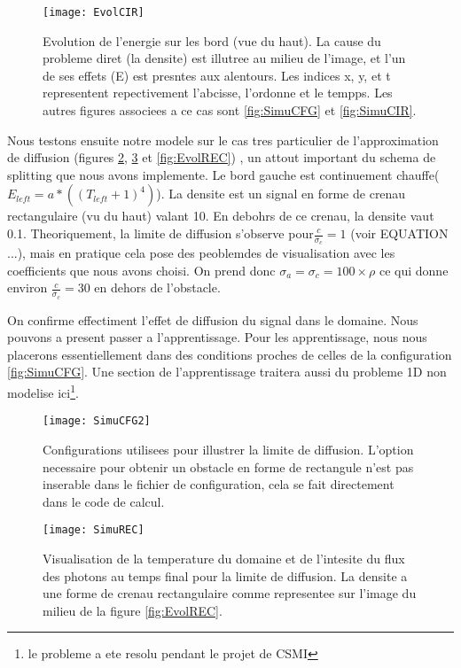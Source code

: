 \begin{figure}[H]
\centering
\texttt{[image: EvolCIR]} 
\decoRule
\caption[EvolCIR]{Evolution de l'energie sur les bord (vue du haut). La cause du probleme diret (la densite) est illutree au milieu de l'image, et l'un de ses effets (E) est presntes aux alentours. Les indices x, y, et t representent repectivement l'abcisse, l'ordonne et le tempps. Les autres figures associees a ce cas sont \ref{fig:SimuCFG} et \ref{fig:SimuCIR}.  }
\label{fig:EvolCIR}
\end{figure}

Nous testons ensuite notre modele sur le cas tres particulier de l'approximation de diffusion (figures \ref{fig:SimuCFG2}, \ref{fig:SimuREC} et \ref{fig:EvolREC}) , un attout important du schema de splitting que nous avons implemente. Le bord gauche est continuement chauffe($E_{left} = a*((T_{left}+1)^4)$). La densite est un signal en forme de crenau rectangulaire (vu du haut) valant 10. En debohrs de ce crenau, la densite vaut 0.1. Theoriquement, la limite de diffusion s'observe pour$\frac{c}{\sigma_c} = 1$ (voir EQUATION ...), mais en pratique cela pose des peoblemdes de visualisation avec les coefficients que nous avons choisi. On prend donc $\sigma_a = \sigma_c = 100 \times \rho$ ce qui donne environ $\frac{c}{\sigma_c} = 30$ en dehors de l'obstacle.

On confirme effectiment l'effet de diffusion du signal dans le domaine. Nous pouvons a present passer a l'apprentissage. Pour les apprentissage, nous nous placerons essentiellement dans des conditions proches de celles de la configuration \ref{fig:SimuCFG}. Une section de l'apprentissage traitera aussi du probleme 1D non modelise ici\footnote{le probleme a ete resolu pendant le projet de CSMI}. 

\begin{figure}[!h]
\centering
\texttt{[image: SimuCFG2]} 
\decoRule
\caption[SimuCFG2]{Configurations utilisees pour illustrer la limite de diffusion. L'option necessaire pour obtenir un obstacle en forme de rectangule n'est pas inserable dans le fichier de configuration, cela se fait directement dans le code de calcul.}
\label{fig:SimuCFG2}
\end{figure}


\begin{figure}[!h]
\centering
\texttt{[image: SimuREC]} 
\decoRule
\caption[SimuREC]{Visualisation de la temperature du domaine et de l'intesite du flux des photons au temps final pour la limite de diffusion. La densite a une forme de crenau rectangulaire comme representee sur l'image du milieu de la figure \ref{fig:EvolREC}.}
\label{fig:SimuREC}
\end{figure}


